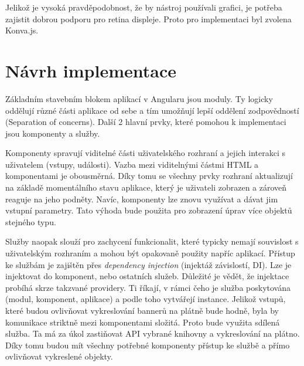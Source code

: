             Jelikož je vysoká pravděpodobnost, že by nástroj používali grafici, je potřeba zajistit dobrou podporu pro retina displeje.
            Proto pro implementaci byl zvolena Konva.js.

    \section{Návrh implementace}\label{sec:implementation-design}
    Základním stavebním blokem aplikací v Angularu jsou moduly. Ty logicky oddělují různé části aplikace od sebe a tím umožňují lepší oddělení
     zodpovědností (Separation of concerns). Další 2 hlavní prvky, které pomohou k implementaci jsou komponenty a služby.  

    Komponenty spravují viditelné části uživatelského rozhraní a jejich interakci s uživatelem (vstupy, události).
    Vazba mezi viditelnými částmi HTML a komponentami je obousměrná. Díky tomu se všechny prvky rozhraní aktualizují na základě momentálního stavu aplikace,
    který je uživateli zobrazen a zároveň reaguje na jeho podněty. Navíc, komponenty lze znovu využívat a dávat jim vstupní parametry.
    Tato výhoda bude použita pro zobrazení úprav více objektů stejného typu. 

    Služby naopak slouží pro zachycení funkcionalit, které typicky nemají souvislost s uživatelským rozhraním a mohou být opakovaně použity napříc aplikací.
    Přístup ke službám je zajištěn přes \emph{dependency injection} (injektáž závislostí, DI). Lze je injektovat do komponent, nebo ostatních služeb.
    Důležité je vědět, že injektace probíhá skrze takzvané providery. Ti říkají, v rámci čeho je služba poskytována (modul, komponent, aplikace) a
    podle toho vytvářejí instance. Jelikož vstupů, které budou ovlivňovat vykreslování bannerů na plátně bude hodně,
    byla by komunikace striktně mezi komponentami složitá. Proto bude využita sdílená služba.
    Ta má za úkol zastiňovat API vybrané knihovny a vykreslování na plátno. Díky tomu budou mít všechny potřebné komponenty přístup ke službě a
    přímo ovlivňovat vykreslené objekty.


